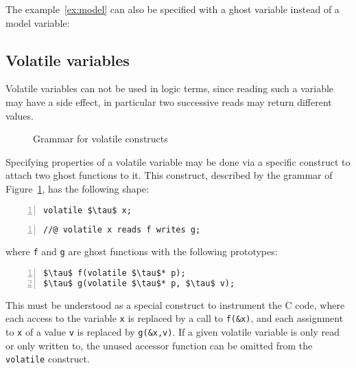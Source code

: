 \begin{example}
  \label{ex:gen_code}
  The example~\ref{ex:model} can also be specified with a ghost
  variable instead of a model variable:


\end{example}

\subsection{Volatile variables}\label{sec:volatile-variables}

Volatile variables can not be used in logic terms, since reading such
a variable may have a side effect, in particular two successive reads
may return different values.

\begin{figure}[htp]
  \begin{cadre}
      
    \end{cadre}
  \caption{Grammar for volatile constructs}
\label{fig:gram:volatile}
\end{figure}

Specifying properties of a volatile variable may be done via a
specific construct to attach two ghost functions to it. This
construct, described by the grammar of Figure~\ref{fig:gram:volatile}, has
the following shape:
\begin{lstlisting}[style=c-basic,firstnumber=1,name=volatile,numbers=left]
volatile $\tau$ x;
\end{lstlisting}
\begin{lstlisting}[style=c-basic,name=volatile,numbers=left]
//@ volatile x reads f writes g;
\end{lstlisting}
where \lstinline|f| and \lstinline|g| are ghost functions with the following prototypes:
\begin{lstlisting}[style=c-basic,name=volatile,numbers=left]
$\tau$ f(volatile $\tau$* p);
$\tau$ g(volatile $\tau$* p, $\tau$ v);
\end{lstlisting}
This must be understood as a special construct to instrument the C
code, where each access to the variable \lstinline|x| is replaced by a call
to \lstinline|f(&x)|, and each assignment to \lstinline|x| of a value
\lstinline|v|
is replaced by \lstinline|g(&x,v)|. If a given volatile variable is only read
or only written to, the unused accessor function can be omitted from the
\lstinline|volatile| construct.

